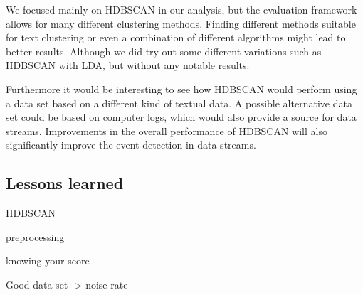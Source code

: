 We focused mainly on HDBSCAN in our analysis, but the evaluation framework allows for many different clustering methods. Finding different methods suitable for text clustering or even a combination of different algorithms might lead to better results. Although we did try out some different variations such as HDBSCAN with LDA, but without any notable results. 

Furthermore it would be interesting to see how HDBSCAN would perform using a data set based on a different kind of textual data. A possible alternative data set could be based on computer logs, which would also provide a source for data streams. Improvements in the overall performance of HDBSCAN will also significantly improve the event detection in data streams.

\subsection{Lessons learned}

HDBSCAN

preprocessing


knowing your score


Good data set -> noise rate


